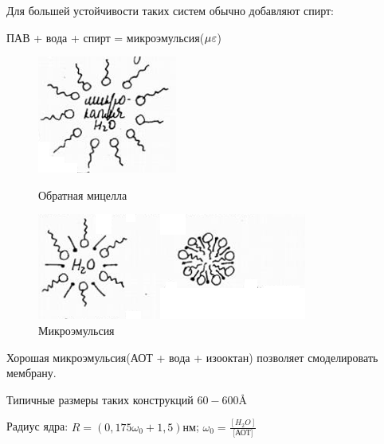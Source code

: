 \begin{lecture}[Седьмая]
\begin{lecSection}
\begin{flushleft}
		\par Для большей устойчивости таких систем обычно добавляют спирт:
		\par ПАВ + вода + спирт = микроэмульсия($\Large \mu \varepsilon \normalsize$)
			\begin{figure}[H]
			\begin{minipage}[h]{0.2\linewidth}
				\centering\includegraphics[width=\linewidth]{lecture_07/pic7}
				\caption{Обратная мицелла}
			\end{minipage}
			\hfill
			\begin{minipage}[h]{0.7\linewidth}
				\centering\includegraphics[width=\linewidth]{lecture_07/pic8}
				\caption{Микроэмульсия}
			\end{minipage}
			\hfill
			\end{figure}
		\par Хорошая микроэмульсия(АОТ + вода + изооктан) позволяет смоделировать мембрану.
		\par Типичные размеры таких конструкций $60-600\text{Å}$
		\par Радиус ядра: $R = (0,175\omega_0 + 1,5)\text{нм}$; $\omega_0 = \frac{[H_2O]}{\text{[АОТ]}}$
	\end{flushleft}
	\end{lecSection}


\end{lecture}
